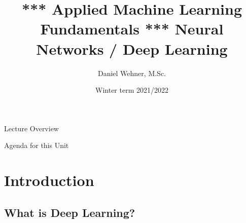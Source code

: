 


\title[Deep Learning]{*** Applied Machine Learning Fundamentals *** Neural Networks / Deep Learning}
\author{Daniel Wehner, M.Sc.}
\date{Winter term 2021/2022}




\maketitlepage


\begin{frame}{Lecture Overview}{}
\end{frame}


\begin{frame}{Agenda for this Unit}
	\begin{multicols}{2}
		\tableofcontents
	\end{multicols}
\end{frame}


\section{Introduction}

\subsection{What is Deep Learning?}

